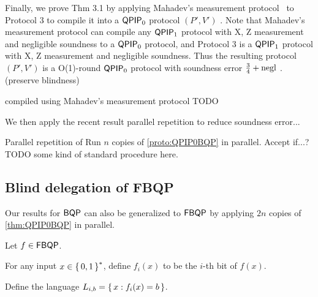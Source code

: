 
Finally, we prove Thm 3.1 by applying Mahadev's measurement protocol~\cite{mahadev_delegation} to Protocol 3 to compile it into a $\operatorname{\mathsf{QPIP}}_0$ protocol $(P', V')$ .
Note that Mahadev's measurement protocol can compile any $\operatorname{\mathsf{QPIP}}_1$ protocol with X, Z measurement and negligible soundness to a $\operatorname{\mathsf{QPIP}}_0$ protocol, and Protocol 3 is a $\operatorname{\mathsf{QPIP}}_1$ protocol with X, Z measurement and negligible soundness.
Thus the resulting protocol $(P', V')$ is a O(1)-round $\operatorname{\mathsf{QPIP}}_0$ protocol with soundness error $\frac{3}{4} + \operatorname{negl}$ . (preserve blindness)


\begin{protocol}{ compiled using Mahadev's measurement protocol}
	\label{proto:QPIP0BQP}
	TODO

\end{protocol}

We then apply the recent result parallel repetition to reduce soundness error...


\begin{protocol}{Parallel repetition of}
	\label{proto:repQPIP0BQP}
	Run $n$ copies of \cref{proto:QPIP0BQP} in parallel. Accept if...? TODO some kind of standard procedure here.

\end{protocol}

\subsection{Blind delegation of FBQP}


Our results for $\operatorname{\mathsf{BQP}}$ can also be generalized to $\operatorname{\mathsf{FBQP}}$ by applying $2n$ copies of \cref{thm:QPIP0BQP} in parallel.

Let $f\in\operatorname{\mathsf{FBQP}}$.

For any input $x\in\set{0, 1}^*$, define $f_i(x)$ to be the $i$-th bit of $f(x)$.

Define the language $L_{i, b}=\set{x:f_i(x)=b}$.

